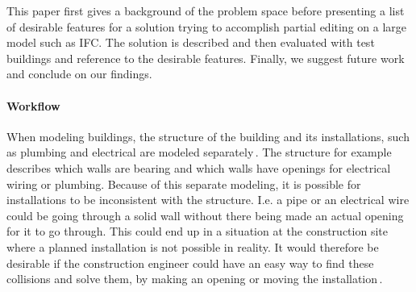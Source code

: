 This paper first gives a background of the problem space before presenting a list of desirable features for a solution trying to accomplish partial editing on a large model such as IFC. The solution is described and then evaluated with test buildings and reference to the desirable features. Finally, we suggest future work and conclude on our findings.

\paragraph{Workflow} %
\label{sec:workflow}
When modeling buildings, the structure of the building and its installations, such as plumbing and electrical are modeled separately\,\cite[pp. 19--20]{jorgensen10}. The structure for example describes which walls are bearing and which walls have openings for electrical wiring or plumbing.  Because of this separate modeling, it is possible for installations to be inconsistent with the structure. I.e. a pipe or an electrical wire could be going through a solid wall without there being made an actual opening for it to go through. This could end up in a situation at the construction site where a planned installation is not possible in reality. It would therefore be desirable if the construction engineer could have an easy way to find these collisions and solve them, by making an opening or moving the installation\,\cite{jorgensen12}.
